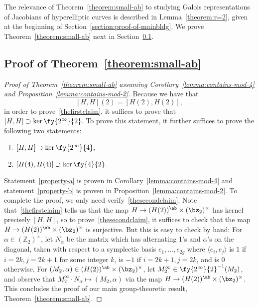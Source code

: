 The relevance of Theorem~\ref{theorem:small-ab} to studying Galois representations of Jacobians of hyperelliptic curves is described in Lemma~\ref{theorem:r=2}, given at the beginning of Section~\ref{section:proof-of-mainbldg}.
We prove Theorem~\ref{theorem:small-ab} next in Section~\ref{subsection:proof-of-first-claim}.

\subsection{Proof of Theorem~\ref{theorem:small-ab}}
\label{subsection:proof-of-first-claim}
\begin{proof}[Proof of Theorem~\ref{theorem:small-ab} assuming
	Corollary~\ref{lemma:contains-mod-4} and 
Proposition~\ref{lemma:contains-mod-2}]
Because we have that $$[H, H](2) = [H(2), H(2)],$$ in order to prove~\eqref{thefirstclaim}, it suffices to prove that 
\(
	[H, H] \supset \ker \fy{2^\infty}{2}. 
\)
To prove this statement, it further suffices to prove the following two statements:
\begin{enumerate}
\item[\customlabel{property-a}{(A)}] \(
	[H, H] \supset \ker \fy{2^\infty}{4},
\)
\item[\customlabel{property-b}{(B)}] \(
	[H(4), H(4)] \supset \ker \fy{4}{2}.
\)
\end{enumerate}
Statement~\ref{property-a} is proven in 
Corollary~\ref{lemma:contains-mod-4}
and statement~\ref{property-b} is proven in
Proposition~\ref{lemma:contains-mod-2}.
To complete the proof, we only need verify~\eqref{thesecondclaim}. Note that~\eqref{thefirstclaim} tells us that the map $H \to (H(2))^{\ab} \times (\bz_2)^\times$ has kernel precisely $[H,H]$, so to prove~\eqref{thesecondclaim}, it suffices to check that the map $H \to (H(2))^{\ab} \times (\bz_2)^\times$ is surjective. 
But this is easy to check by hand: 
For $\alpha \in (\mathbb Z_2)^\times$, let $N_\alpha$ be the matrix which
has alternating $1$'s and $\alpha$'s on the diagonal, taken with respect to
a symplectic basis $e_1, \ldots, e_{2g}$ where $\langle e_{i}, e_{j} \rangle$ 
is $1$ if $i = 2k, j = 2k+1$ for some integer $k$, is $-1$ if $i = 2k+1, j = 2k$, and is $0$ otherwise.
For $(M_2, \alpha) \in (H(2))^{\ab} \times (\bz_2)^\times$, let $M_2^\infty \in \fy{2^\infty}{2}^{-1}(M_2)$, and observe that $M_2^\infty \cdot N_\alpha \mapsto (M_2, \alpha)$ via the map $H \to (H(2))^{\ab} \times (\bz_2)^\times$. This concludes the proof of our main group-theoretic result, Theorem~\ref{theorem:small-ab}.
\end{proof}
